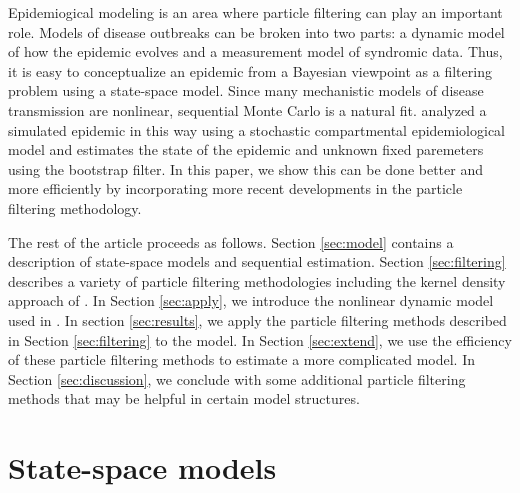 \documentclass{elsarticle}
\begin{document}
Epidemiogical modeling is an area where particle filtering can play an important role.  Models of disease outbreaks can be broken into two parts: a dynamic model of how the epidemic evolves and a measurement model of syndromic data.  Thus, it is easy to conceptualize an epidemic from a Bayesian viewpoint as a filtering problem using a state-space model.  Since many mechanistic models of disease transmission are nonlinear, sequential Monte Carlo is a natural fit.  \citet{skvortsov2012monitoring} analyzed a simulated epidemic in this way using a stochastic compartmental epidemiological model and estimates the state of the epidemic and unknown fixed paremeters using the bootstrap filter.  In this paper, we show this can be done better and more efficiently by incorporating more recent developments in the particle filtering methodology.

The rest of the article proceeds as follows. Section \ref{sec:model} contains a description of state-space models and sequential estimation. Section \ref{sec:filtering} describes a variety of particle filtering methodologies including the kernel density approach of \cite{Liu:West:comb:2001}.  In Section \ref{sec:apply}, we introduce the nonlinear dynamic model used in \citet{skvortsov2012monitoring}. In section \ref{sec:results}, we apply the particle filtering methods described in Section \ref{sec:filtering} to the \citet{skvortsov2012monitoring} model.  In Section \ref{sec:extend}, we use the efficiency of these particle filtering methods to estimate a more complicated model.  In Section \ref{sec:discussion}, we conclude with some additional particle filtering methods that may be helpful in certain model structures.

\section{State-space models \label{sec:model}}
\end{document}
